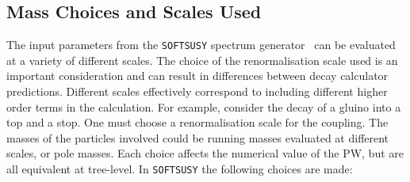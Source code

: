 \documentclass[final,3p,times]{elsarticle}
\begin{document}
\subsection{Mass Choices and Scales Used} \label{masschoicesandscales}
The input parameters from the {\tt SOFTSUSY} spectrum
generator~\cite{Allanach:2001kg,Allanach:2013kza} can be evaluated at a
variety of different scales. The choice of the renormalisation scale used is
an important consideration and can result in differences between decay
calculator predictions. Different scales effectively correspond to including
different higher order terms in the calculation. For example, consider the
decay of a gluino  into a top and a stop. One must choose a renormalisation
scale for the coupling. The masses of the particles involved could be running
masses evaluated at different scales, or pole masses. Each choice affects the
numerical value of the PW, but are all equivalent at tree-level. In {\tt SOFTSUSY} the following choices are made: 
\end{document}
